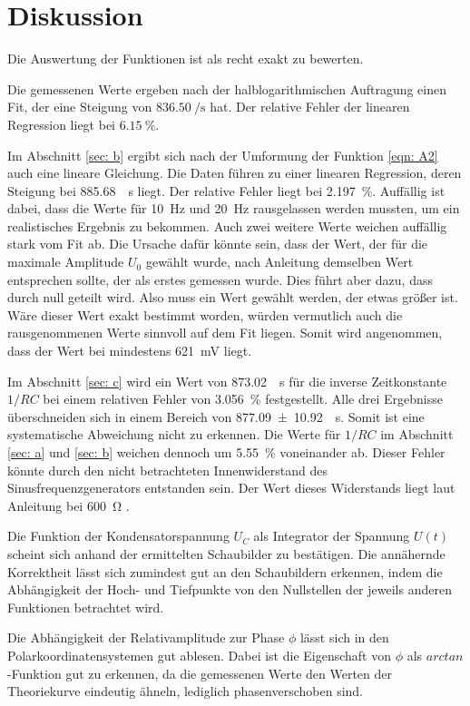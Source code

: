 \section{Diskussion}
\label{sec: dis}

Die Auswertung der Funktionen ist als recht exakt zu bewerten. 

\noindent Die gemessenen Werte ergeben nach der halblogarithmischen Auftragung einen Fit, der eine Steigung von 
$\SI[per-mode=fraction]{836.50}{\per\second}$ hat. Der relative Fehler der linearen Regression liegt bei $\SI{6.15}{\percent}$. 

\noindent Im Abschnitt \ref{sec: b} ergibt sich nach der Umformung der Funktion \eqref{eqn: A2}  auch eine lineare Gleichung.
Die Daten führen zu einer linearen Regression, deren Steigung bei \SI[per-mode=fraction]{885.68}{\per\second} liegt. Der relative
Fehler liegt bei \SI{2.197}{\percent}. Auffällig ist dabei, dass die Werte für \SI{10}{\hertz} und \SI{20}{\hertz} rausgelassen werden mussten,
um ein realistisches Ergebnis zu bekommen. Auch zwei weitere Werte weichen auffällig stark vom Fit ab. Die Ursache dafür könnte sein,
dass der Wert, der für die maximale Amplitude $U_0$ gewählt wurde, nach Anleitung demselben Wert entsprechen sollte, der als erstes gemessen wurde. Dies führt aber dazu, dass durch null geteilt wird. Also muss ein Wert gewählt werden, der etwas größer ist. Wäre dieser Wert exakt bestimmt worden, würden vermutlich auch die rausgenommenen Werte sinnvoll auf dem Fit liegen. 
Somit wird angenommen, dass der Wert bei mindestens \SI{621}{\milli\volt} liegt. 

\noindent Im Abschnitt \ref{sec: c} wird ein Wert von \SI[per-mode=fraction]{873.02}{\per\second} für die inverse Zeitkonstante $1/RC$ bei einem relativen
Fehler von \SI{3.056}{\percent} festgestellt.
Alle drei Ergebnisse überschneiden sich in einem Bereich von
\SI[per-mode=fraction]{877.09 \pm 10.92}{\per\second}. Somit ist eine systematische Abweichung nicht zu erkennen.
Die Werte für $1/RC$ im Abschnitt \ref{sec: a} und \ref{sec: b} weichen dennoch um \SI{5.55}{\percent} voneinander ab. Dieser Fehler könnte durch den nicht
betrachteten Innenwiderstand des Sinusfrequenzgenerators entstanden sein. Der Wert dieses Widerstands liegt laut Anleitung bei
\SI{600}{\ohm} \cite{versuch}. 

\noindent Die Funktion der Kondensatorspannung $U_{C}$ als Integrator der Spannung $U(t)$ scheint sich anhand der ermittelten
Schaubilder zu bestätigen. Die annähernde Korrektheit lässt sich zumindest gut an den Schaubildern erkennen,
indem die Abhängigkeit der Hoch- und Tiefpunkte von den Nullstellen der jeweils anderen Funktionen betrachtet wird. 

\noindent Die Abhängigkeit der Relativamplitude zur Phase $\phi$ lässt sich in den Polarkoordinatensystemen gut ablesen.
Dabei ist die Eigenschaft von $\phi$ als $arctan$-Funktion gut zu erkennen, da die gemessenen Werte den Werten der Theoriekurve
eindeutig ähneln, lediglich phasenverschoben sind. 

